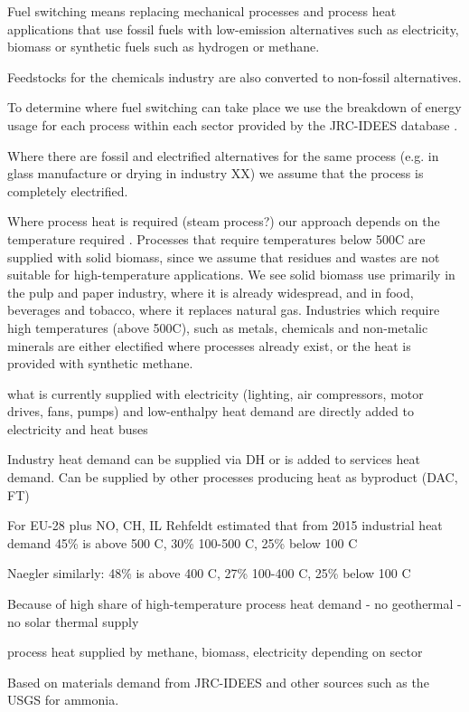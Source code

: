 Fuel switching means
replacing mechanical processes and process heat applications that use fossil
fuels with low-emission alternatives such as electricity, biomass or synthetic
fuels such as hydrogen or methane.

Feedstocks for the chemicals industry are
also converted to non-fossil alternatives.

To determine where fuel switching can take place we use the breakdown of energy
usage for each process within each sector provided by the JRC-IDEES database
.

Where there are fossil and electrified alternatives for the same
process (e.g. in glass manufacture or drying in industry XX) we assume that the
process is completely electrified.

Where process heat is required (steam
process?) our approach depends on the temperature required
. Processes that require temperatures below
500\deg{}C are supplied with solid biomass, since we assume that residues and
wastes are not suitable for high-temperature applications. We see solid biomass
use primarily in the pulp and paper industry, where it is already widespread,
and in food, beverages and tobacco, where it replaces natural gas. Industries
which require high temperatures (above 500\deg{}C), such as metals, chemicals
and non-metalic minerals are either electified where processes already exist, or
the heat is provided with synthetic methane.

what is currently supplied with electricity (lighting, air compressors, motor drives, fans, pumps)
and low-enthalpy heat demand are directly added to electricity and heat buses

Industry heat demand can be supplied via DH or is added to services heat demand.
Can be supplied by other processes producing heat as byproduct (DAC, FT)

For EU-28 plus NO, CH, IL Rehfeldt estimated that from 2015 industrial heat demand
45\% is above 500 \deg{} C, 30\% 100-500 \deg{}C, 25\% below 100 \deg{} C

Naegler similarly:
48\% is above 400 \deg{} C, 27\% 100-400 \deg{}C, 25\% below 100 \deg{} C

Because of high share of high-temperature process heat demand
- no geothermal
- no solar thermal supply

process heat supplied by methane, biomass, electricity depending on sector

Based on materials demand from JRC-IDEES and other sources such as the USGS for
ammonia.

